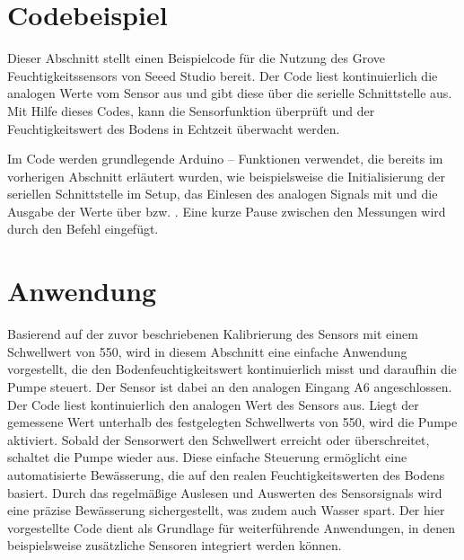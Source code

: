 		\clearpage
	
	
	\section{Codebeispiel}
		Dieser Abschnitt stellt einen Beispielcode für die Nutzung des Grove Feuchtigkeitssensors von Seeed Studio bereit. Der Code liest kontinuierlich die analogen Werte vom Sensor aus und gibt diese über die serielle Schnittstelle aus. Mit Hilfe dieses Codes, kann die Sensorfunktion überprüft und der Feuchtigkeitswert des Bodens in Echtzeit überwacht werden.
		
		\vspace{1\baselineskip}
		
		Im Code werden grundlegende Arduino – Funktionen verwendet, die bereits im vorherigen Abschnitt erläutert wurden, wie beispielsweise die Initialisierung der seriellen Schnittstelle im Setup, das Einlesen des analogen Signals mit  und die Ausgabe der Werte über  bzw. . Eine kurze Pause zwischen den Messungen wird durch den Befehl  eingefügt.
		
		\begin{center}
			\label{Code:Beispielcode}
		\end{center}


	\section{Anwendung}
		Basierend auf der zuvor beschriebenen Kalibrierung des Sensors mit einem Schwellwert von 550, wird in diesem Abschnitt eine einfache Anwendung vorgestellt, die den Bodenfeuchtigkeitswert kontinuierlich misst und daraufhin die Pumpe steuert. Der Sensor ist dabei an den analogen Eingang A6 angeschlossen.
		Der Code liest kontinuierlich den analogen Wert des Sensors aus. Liegt der gemessene Wert unterhalb des festgelegten Schwellwerts von 550, wird die Pumpe aktiviert. Sobald der Sensorwert den Schwellwert erreicht oder überschreitet, schaltet die Pumpe wieder aus.
		Diese einfache Steuerung ermöglicht eine automatisierte Bewässerung, die auf den realen Feuchtigkeitswerten des Bodens basiert. Durch das regelmäßige Auslesen und Auswerten des Sensorsignals wird eine präzise Bewässerung sichergestellt, was zudem auch Wasser spart. 
		Der hier vorgestellte Code dient als Grundlage für weiterführende Anwendungen, in denen beispielsweise zusätzliche Sensoren integriert werden können.
		
